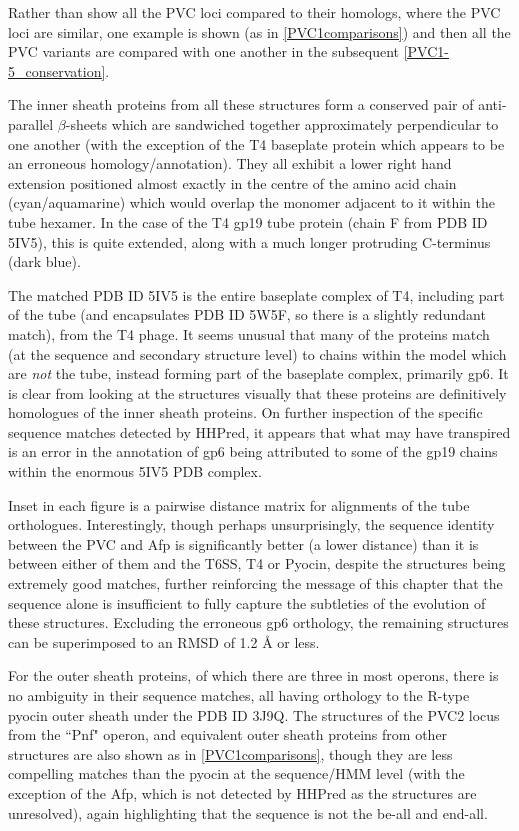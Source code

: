 Rather than show all the PVC loci compared to their homologs, where the PVC loci are similar, one example is shown (as in \vref{PVC1comparisons}) and then all the PVC variants are compared with one another in the subsequent \vref{PVC1-5_conservation}.

The inner sheath proteins from all these structures form a conserved pair of anti-parallel $\beta$-sheets which are sandwiched together approximately perpendicular to one another (with the exception of the T4 baseplate protein which appears to be an erroneous homology/annotation). They all exhibit a lower right hand extension positioned almost exactly in the centre of the amino acid chain (cyan/aquamarine) which would overlap the monomer adjacent to it within the tube hexamer. In the case of the T4 gp19 tube protein (chain F from PDB ID 5IV5), this is quite extended, along with a much longer protruding C-terminus (dark blue).

The matched PDB ID 5IV5 is the entire baseplate complex of T4, including part of the tube (and encapsulates PDB ID 5W5F, so there is a slightly redundant match), from the T4 phage. It seems unusual that many of the proteins match (at the sequence and secondary structure level) to chains within the model which are \emph{not} the tube, instead forming part of the baseplate complex, primarily gp6. It is clear from looking at the structures visually that these proteins are definitively homologues of the inner sheath proteins. On further inspection of the specific sequence matches detected by HHPred, it appears that what may have transpired is an error in the annotation of gp6 being attributed to some of the gp19 chains within the enormous 5IV5 PDB complex.

Inset in each figure is a pairwise distance matrix for alignments of the tube orthologues. Interestingly, though perhaps unsurprisingly, the sequence identity between the PVC and Afp is significantly better (a lower distance) than it is between either of them and the T6SS, T4 or Pyocin, despite the structures being extremely good matches, further reinforcing the message of this chapter that the sequence alone is insufficient to fully capture the subtleties of the evolution of these structures. Excluding the erroneous gp6 orthology, the remaining structures can be superimposed to an RMSD of 1.2 \AA{} or less.

For the outer sheath proteins, of which there are three in most operons, there is no ambiguity in their sequence matches, all having orthology to the R-type pyocin outer sheath under the PDB ID 3J9Q. The structures of the PVC2 locus from the ``Pnf" operon, and equivalent outer sheath proteins from other structures are also shown as in \vref{PVC1comparisons}, though they are less compelling matches than the pyocin at the sequence/HMM level (with the exception of the Afp, which is not detected by HHPred as the structures are unresolved), again highlighting that the sequence is not the be-all and end-all.


